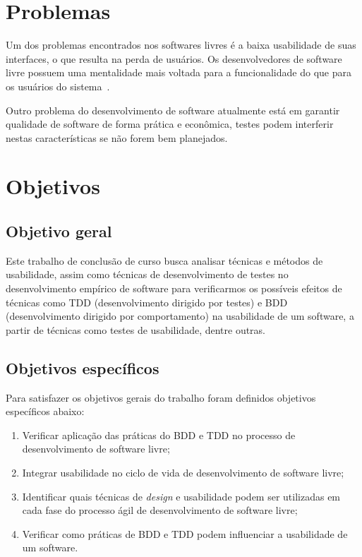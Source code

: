  

\section{Problemas}

Um dos problemas encontrados nos softwares livres é a baixa usabilidade de suas interfaces, o que resulta na perda de usuários. 
%
Os desenvolvedores de software livre possuem uma mentalidade mais voltada para a funcionalidade do que para os usuários do sistema~\cite{santos2012}. 

Outro problema do desenvolvimento de software atualmente está em garantir qualidade de software de forma prática e econômica, testes podem interferir nestas características se não forem bem planejados.

\section{Objetivos}

\subsection{Objetivo geral}
	 
Este trabalho de conclusão de curso busca analisar técnicas e métodos de usabilidade, assim como técnicas de desenvolvimento de testes no desenvolvimento empírico de software para verificarmos os possíveis efeitos de técnicas como TDD (desenvolvimento dirigido por testes) e BDD (desenvolvimento dirigido por comportamento) na usabilidade de um software, a partir de técnicas como testes de usabilidade, dentre outras.

	 
\subsection{Objetivos específicos}

Para satisfazer os objetivos gerais do trabalho foram definidos objetivos específicos abaixo:

\begin{enumerate}
\item Verificar aplicação das práticas do BDD e TDD no processo de desenvolvimento de software livre;

\item Integrar usabilidade no ciclo de vida de desenvolvimento de software livre;
\item Identificar quais técnicas de \emph{design} e usabilidade  podem ser utilizadas em cada fase do processo ágil de desenvolvimento de software livre;
\item Verificar como práticas de BDD e TDD podem influenciar a usabilidade de um software.


\end{enumerate}

